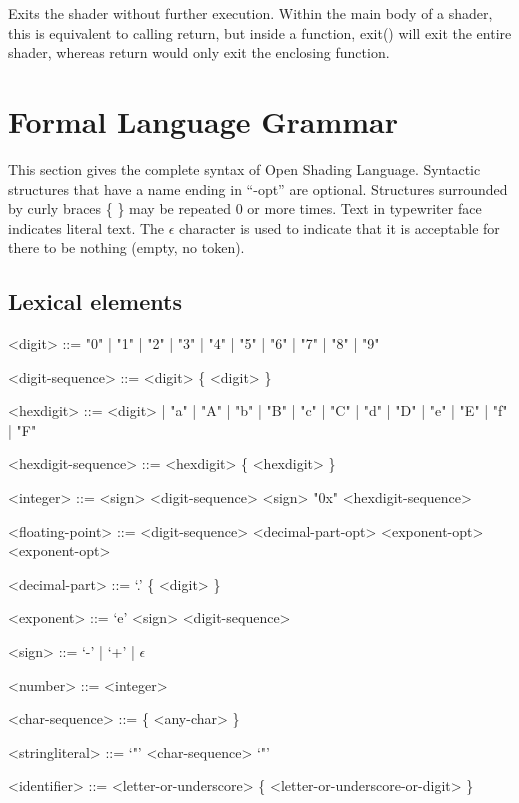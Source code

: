 \documentclass[11pt,letterpaper]{book}
\def\langname{Open Shading Language\xspace}
\begin{document}
Exits the shader without further execution.  Within the main body of a
shader, this is equivalent to calling {\cf return}, but inside a
function, {\cf exit()} will exit the entire shader, whereas {\cf return}
would only exit the enclosing function.
\apiend





\chapter{Formal Language Grammar}
\label{chap:grammar}

This section gives the complete syntax of \langname.  Syntactic
structures that have a name ending in ``-opt'' are optional.  Structures
surrounded by curly braces \{ \} may be repeated 0 or more times.  Text
in {\cf typewriter} face indicates literal text.  The $\epsilon$
character is used to indicate that it is acceptable for there to be
nothing (empty, no token).

\setlength{\grammarindent}{2cm}

\section*{Lexical elements}

\begin{grammar}

<digit> ::= "0" | "1" | "2" | "3" | "4" | "5" | "6" | "7" | "8" | "9"

<digit-sequence> ::= <digit> \{ <digit> \}

<hexdigit> ::= <digit> | "a" | "A" | "b" | "B" | "c" | "C" | "d" | "D" | "e" | "E" | "f" | "F"

<hexdigit-sequence> ::= <hexdigit> \{ <hexdigit> \}

<integer> ::= <sign> <digit-sequence>
\alt <sign> "0x" <hexdigit-sequence>

<floating-point> ::= <digit-sequence> <decimal-part-opt> <exponent-opt>
 <exponent-opt>

<decimal-part> ::= `.' \{ <digit> \}

<exponent> ::= `e' <sign> <digit-sequence>

<sign> ::= `-' | `+' | $\epsilon$

<number> ::= <integer>

<char-sequence> ::= \{ <any-char> \} 

<stringliteral> ::= `"' <char-sequence> `"'

<identifier> ::= <letter-or-underscore> \{ <letter-or-underscore-or-digit> \}

\end{grammar}
\end{document}
